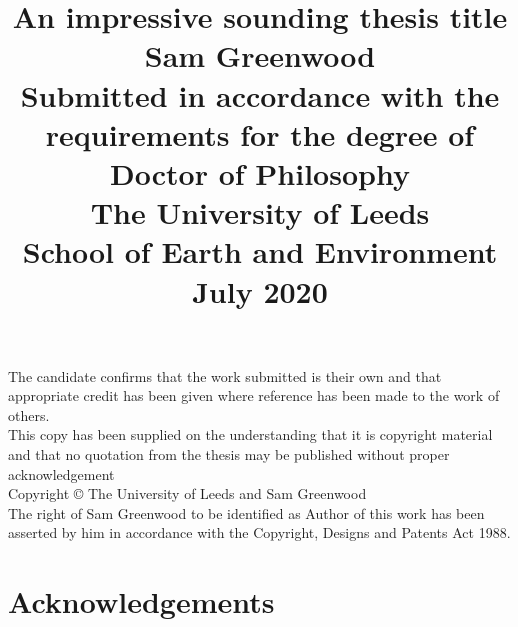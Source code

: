 \documentclass[titlepage,twoside,onecolumn,a4paper,11pt]{report}
\begin{document}

\makeatletter
\def\cleardoublepage{\clearpage\if@twoside \ifodd\c@page\else%
\hbox{}%
\thispagestyle{empty}
\newpage%
\if@twocolumn\hbox{}\newpage\fi\fi\fi}
\makeatother

\title{
\huge{\textbf{An impressive sounding thesis title}}\\[2cm]
\Large{{\bf Sam Greenwood}} \\[4cm]
\large{Submitted in accordance with the requirements for the degree of\\
Doctor of Philosophy} \\[2cm]
\large{The University of Leeds}\\
\large{School of Earth and Environment}\\ [2cm]
\large{July 2020} }
\author{} \date{}
\maketitle
\cleardoublepage

The candidate confirms that the work submitted is their own and that appropriate credit has been given where reference has been made to the work of others.\\

This copy has been supplied on the understanding that it is copyright material and that no quotation from the thesis may be published without proper acknowledgement\\

Copyright \copyright{} The University of Leeds and Sam Greenwood\\
The right of Sam Greenwood to be identified as Author of this work has been asserted by him in accordance with the Copyright, Designs and Patents Act 1988.
\cleardoublepage



\chapter*{Acknowledgements}
\fancyhead[RO,LE]{\thepage}
\end{document}
